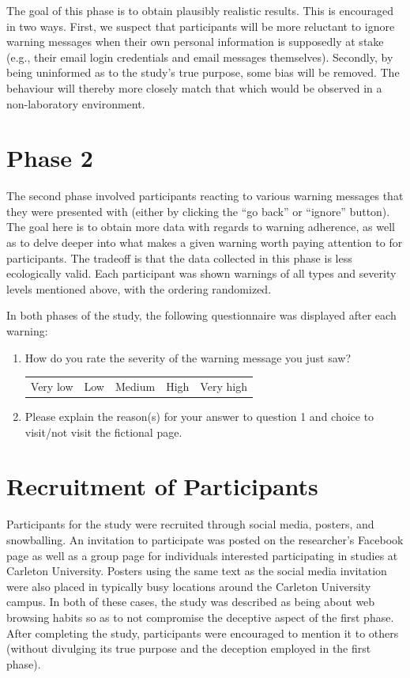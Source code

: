The goal of this phase is to obtain plausibly realistic results. This is encouraged in two ways. First, we suspect that participants will be more reluctant to ignore warning messages when their own personal information is supposedly at stake (e.g., their email login credentials and email messages themselves). Secondly, by being uninformed as to the study's true purpose, some bias will be removed. The behaviour will thereby more closely match that which would be observed in a non-laboratory environment.

\section{Phase 2}
The second phase involved participants reacting to various warning messages that they were presented with (either by clicking the ``go back'' or ``ignore'' button). The goal here is to obtain more data with regards to warning adherence, as well as to delve deeper into what makes a given warning worth paying attention to for participants. The tradeoff is that the data collected in this phase is less ecologically valid. Each participant was shown warnings of all types and severity levels mentioned above, with the ordering randomized.

In both phases of the study, the following questionnaire was displayed after each warning:

\begin{enumerate}
	\item How do you rate the severity of the warning message you just saw?
	\begin{center}
		\begin{tabular}{ccccc}
			Very low & Low & Medium & High & Very high\\
		\end{tabular}
	\end{center}
	\item Please explain the reason(s) for your answer to question 1 and choice to visit/not visit the fictional page.
\end{enumerate}


\section{Recruitment of Participants}
Participants for the study were recruited through social media, posters, and snowballing. An invitation to participate was posted on the researcher's Facebook page as well as a group page for individuals interested participating in studies at Carleton University. Posters using the same text as the social media invitation were also placed in typically busy locations around the Carleton University campus. In both of these cases, the study was described as being about web browsing habits so as to not compromise the deceptive aspect of the first phase. After completing the study, participants were encouraged to mention it to others (without divulging its true purpose and the deception employed in the first phase).

